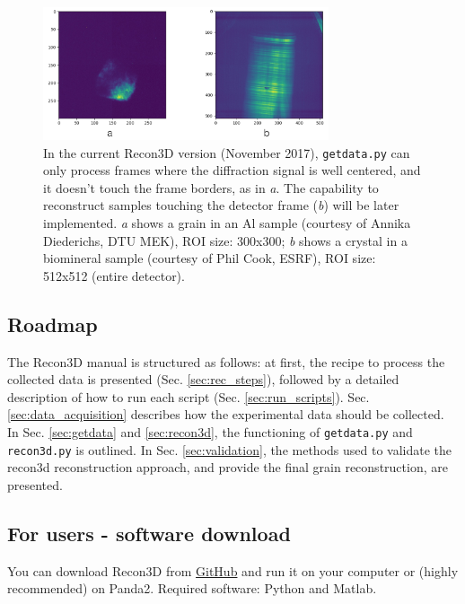 \documentclass[11pt]{scrartcl}
\begin{document}
\begin{figure}[h]
    \centering
    \includegraphics[width=0.75\textwidth]{centered_not_centered}
    \caption{In the current Recon3D version (November 2017), {\texttt{getdata.py}} can only process frames where the diffraction signal is well centered, and it doesn't touch the frame borders, as in {\emph{a}}. The capability to reconstruct samples touching the detector frame ({\emph{b}}) will be later implemented. {\emph{a}} shows a grain in an Al sample (courtesy of Annika Diederichs, {\footnotesize{DTU MEK}}), {\footnotesize{ROI}} size: 300x300; {\emph{b}} shows a crystal in a biomineral sample (courtesy of Phil Cook, {\footnotesize{ESRF}}), {\footnotesize{ROI}} size: 512x512 (entire detector).}
    \label{fig:centered_not_centered}
\end{figure}

\subsection{Roadmap}

The Recon3D manual is structured as follows: at first, the recipe to process the collected data is presented (Sec. {\ref{sec:rec_steps}}), followed by a detailed description of how to run each script (Sec. {\ref{sec:run_scripts}}). Sec. {\ref{sec:data_acquisition}} describes how the experimental data should be collected. In Sec. {\ref{sec:getdata}} and {\ref{sec:recon3d}}, the functioning of {\texttt{getdata.py}} and {\texttt{recon3d.py}} is outlined. In Sec. {\ref{sec:validation}}, the methods used to validate the recon3d reconstruction approach, and provide the final grain reconstruction, are presented.

\subsection{For users - software download}

You can download Recon3D from  \href{https://github.com/albusdemens/Recon3D}{GitHub} and run it on your computer or (highly recommended) on Panda2. Required software: Python and Matlab.
\end{document}
